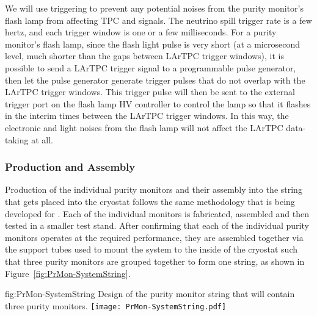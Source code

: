 We will use triggering to prevent any potential noises from the purity monitor's flash lamp from affecting TPC and  signals. The neutrino spill trigger rate is a few hertz, and each trigger window is one or a few milliseconds. For a purity monitor's flash lamp, since the flash light pulse is very short (at a microsecond level, much shorter than the gaps between LArTPC trigger windows), it is possible to send a LArTPC trigger signal to a programmable pulse generator, then let the pulse generator generate trigger pulses that do not overlap with the LArTPC trigger windows. This trigger pulse will then be sent to the external trigger port on the flash lamp HV controller to control the lamp so that it flashes in the interim times between the LArTPC trigger windows. In this way, the electronic and light noises from the flash lamp will not affect the LArTPC data-taking at all.



\subsubsection{Production and Assembly}
\label{sec:PrMon-Production-Assembly}
Production of the individual purity monitors and their assembly into the string that gets placed into the  cryostat follows the same methodology that is being developed for .  Each of the individual monitors is fabricated, assembled and then tested in a smaller test stand.  After confirming that each of the individual purity monitors operates at the required performance, they are assembled together via the support tubes used to mount the system to the inside of the cryostat such that three purity monitors are grouped together to form one string, as shown in Figure~\ref{fig:PrMon-SystemString}.




\begin{dunefigure}{fig:PrMon-SystemString}
  {Design of the purity monitor string that will contain three purity monitors.}
  \texttt{[image: PrMon-SystemString.pdf]}
\end{dunefigure}



